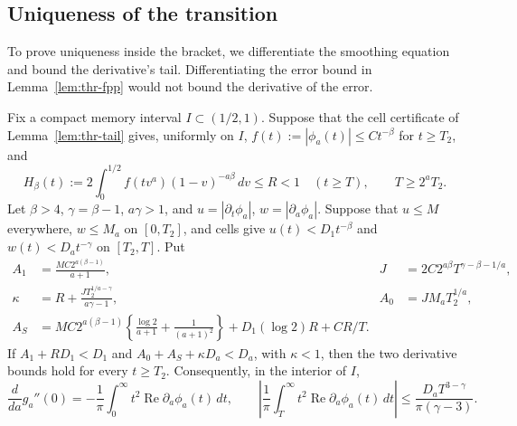 \subsection{Uniqueness of the transition}
\label{or:transition-unique}

To prove uniqueness inside the bracket, we differentiate the smoothing equation and bound the derivative's tail. Differentiating the error bound in Lemma~\ref{lem:thr-fpp} would not bound the derivative of the error.

\begin{lemma}\label{lem:thr-parameter-tail}
Fix a compact memory interval $I\subset(1/2,1)$. Suppose that the
cell certificate of Lemma~\ref{lem:thr-tail} gives, uniformly on $I$,
$f(t):=|\phi_a(t)|\le Ct^{-\beta}$ for $t\ge T_2$, and
\[
 H_\beta(t):=2\int_0^{1/2}f(tv^a)(1-v)^{-a\beta}\,dv\le R<1
 \quad(t\ge T),\qquad T\ge2^aT_2.
\]
Let $\beta>4$, $\gamma=\beta-1$, $a\gamma>1$, and
$u=|\partial_t\phi_a|$, $w=|\partial_a\phi_a|$.
Suppose that $u\le M$ everywhere, $w\le M_a$ on $[0,T_2]$, and
cells give $u(t)<D_1t^{-\beta}$ and $w(t)<D_at^{-\gamma}$ on $[T_2,T]$.
Put
\begin{align*}
 A_1&=\frac{MC2^{a(\beta-1)}}{a+1},&
 J&=2C2^{a\beta}T^{\gamma-\beta-1/a},\\
 \kappa&=R+\frac{JT_2^{1/a-\gamma}}{a\gamma-1},&
 A_0&=JM_aT_2^{1/a},\\
 A_S&=MC2^{a(\beta-1)}
 \left\{\frac{\log2}{a+1}+\frac1{(a+1)^2}\right\}
       +D_1(\log2)R+CR/T.
\end{align*}
If $A_1+RD_1<D_1$ and $A_0+A_S+\kappa D_a<D_a$, with
$\kappa<1$, then the two derivative bounds hold for every $t\ge T_2$.
Consequently, in the interior of $I$,
\begin{equation}\label{eq:thr-memory-derivative}
 \frac{d}{da}g_a''(0)=-\frac1\pi\int_0^\infty
 t^2\operatorname{Re}\partial_a\phi_a(t)\,dt,
 \qquad
 \left|\frac1\pi\int_T^\infty t^2
 \operatorname{Re}\partial_a\phi_a(t)\,dt\right|
 \le\frac{D_aT^{3-\gamma}}{\pi(\gamma-3)}.
\end{equation}
\end{lemma}

